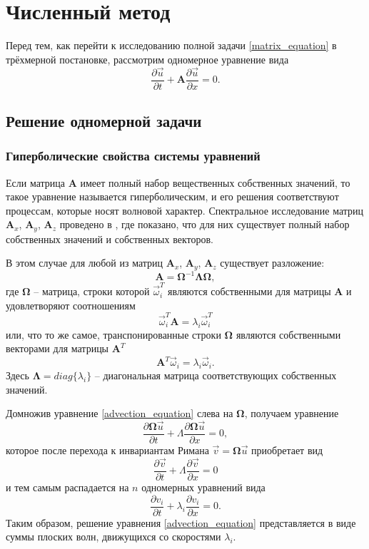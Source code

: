\section{Численный метод}

Перед тем, как перейти к исследованию полной задачи \ref{matrix_equation} в трёхмерной постановке, рассмотрим одномерное уравнение вида
\begin{equation}
\frac{\partial\vec{u}}{\partial{t}}+\mathbf{A}\frac{\partial\vec{u}}{\partial{x}}=0.
\label{advection_equation}
\end{equation}

\subsection{Решение одномерной задачи}

\subsubsection{Гиперболические свойства системы уравнений}
\label{sec:hyperbolic_features}

Если матрица $\mathbf{A}$ имеет полный набор вещественных собственных значений, 
то такое уравнение называется гиперболическим, и его решения соответствуют 
процессам, которые носят волновой характер. Спектральное исследование матриц $\mathbf{A}_x$, $\mathbf{A}_y$, $\mathbf{A}_z$ проведено в \cite{chelnokov}, где показано, что для них существует полный набор собственных значений и собственных векторов.

В этом случае для любой из матриц $\mathbf{A}_x$, $\mathbf{A}_y$, $\mathbf{A}_z$ существует разложение:
$$\mathbf{A}=\mathbf\Omega^{-1}\mathbf\Lambda\mathbf\Omega,$$
где $\mathbf\Omega$ -- матрица, строки которой $\vec\omega_i^T$ являются собственными для матрицы $\mathbf A$ и
удовлетворяют соотношениям
$$\vec\omega_i^T\mathbf A=\lambda_i\vec\omega_i^T$$ или, что то же самое, транспонированные строки $\mathbf\Omega$ являются собственными векторами для матрицы $\mathbf A^T$
$$\mathbf A^T\vec\omega_i=\lambda_i\vec\omega_i.$$
Здесь $\mathbf\Lambda=diag\{\lambda_i\}$ -- диагональная матрица соответствующих собственных значений.

Домножив уравнение \ref{advection_equation} слева на $\mathbf\Omega$, получаем уравнение
$$\frac{\partial{\mathbf\Omega{\vec u}}}{\partial t}+
\Lambda\frac{\partial{\mathbf\Omega{\vec u}}}{\partial x}=0,$$
которое после перехода к инвариантам Римана ${\vec v}=\mathbf\Omega{\vec u}$ приобретает вид
$$\frac{\partial{\vec v}}{\partial t}+
\Lambda\frac{\partial{\vec v}}{\partial x}=0$$
и тем самым распадается на $n$ одномерных уравнений вида
\begin{equation}
\frac{\partial{v_i}}{\partial t}+\lambda_i\frac{\partial{v_i}}{\partial x}=0.
\label{advection_equation_splitted}
\end{equation}
Таким образом, решение уравнения \ref{advection_equation} представляется в виде
суммы плоских волн, движущихся со скоростями $\lambda_i$.


